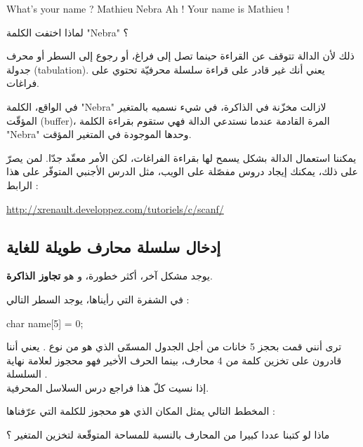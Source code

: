 \begin{Console}
  What's your name ? Mathieu Nebra
  Ah ! Your name is Mathieu !
\end{Console}

\begin{question}
لماذا اختفت الكلمة
"\textenglish{Nebra}"
؟
\end{question}

ذلك لأن الدالة
تتوقف عن القراءة حينما تصل إلى فراغ، أو رجوع إلى السطر أو محرف جدولة
(\textenglish{tabulation}).
يعني أنك غير قادر على قراءة سلسلة محرفيّة تحتوي على فراغات.

\begin{information}
  في الواقع، الكلمة
  "\textenglish{Nebra}"
  لازالت مخزّنة في الذاكرة، في  شيء نسميه بالمتغير المؤقّت
  (\textenglish{buffer})،
  المرة القادمة عندما نستدعي الدالة
  فهي ستقوم بقراءة الكلمة
  "\textenglish{Nebra}"
    وحدها الموجودة في المتغير المؤقت.
\end{information}

يمكننا استعمال الدالة
بشكل يسمح لها بقراءة الفراغات، لكن الأمر معقّد جدّا. لمن يصرّ على ذلك، يمكنك إيجاد دروس مفصّلة على الويب، مثل الدرس الأجنبي المتوفّر على هذا الرابط :

\url{http://xrenault.developpez.com/tutoriels/c/scanf/}

\subsection{إدخال سلسلة محارف طويلة للغاية}

يوجد مشكل آخر، أكثر خطورة، و هو
\textbf{تجاوز الذاكرة}.

في الشفرة التي رأيناها، يوجد السطر التالي :

\begin{Csource}
  char name[5] = {0};
\end{Csource}

ترى أنني قمت بحجز 5 خانات من أجل الجدول المسمّى
الذي هو من نوع
.
يعني أننا قادرون على تخزين كلمة من 4 محارف، بينما الحرف الأخير فهو محجوز لعلامة نهاية السلسلة
.\\
إذا نسيت كلّ هذا فراجع درس السلاسل المحرفية.

المخطط التالي يمثل المكان الذي هو محجوز للكلمة التي عرّفناها :


ماذا لو كتبنا عددا كبيرا من المحارف بالنسبة للمساحة المتوقّعة لتخزين المتغير ؟

